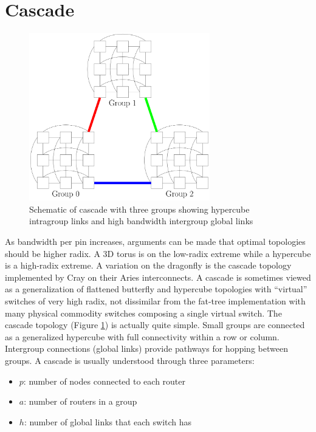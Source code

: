 
\section{Cascade}
\label{sec:tutorial:cascade}

\begin{figure}[h!]
\centering
\includegraphics[width=0.7\textwidth]{figures/tikz/cascade/cascade.png}
\caption{Schematic of cascade with three groups showing hypercube intragroup links and high bandwidth intergroup global links}
\label{fig:topologies:cascade}
\end{figure}

As bandwidth per pin increases, arguments can be made that optimal topologies should be higher radix.
A 3D torus is on the low-radix extreme while a hypercube is a high-radix extreme.
A variation on the dragonfly is the cascade topology implemented by Cray on their Aries interconnects.
A cascade is sometimes viewed as a generalization of flattened butterfly and hypercube topologies with ``virtual'' switches of very high radix,
not dissimilar from the fat-tree implementation with many physical commodity switches composing a single virtual switch.
The cascade topology (Figure \ref{fig:topologies:cascade}) is actually quite simple.
Small groups are connected as a generalized hypercube with full connectivity within a row or column.
Intergroup connections (global links) provide pathways for hopping between groups.
A cascade is usually understood through three parameters:
\begin{itemize}
\item $p$: number of nodes connected to each router
\item $a$: number of routers in a group
\item $h$: number of global links that each switch has
\end{itemize}

